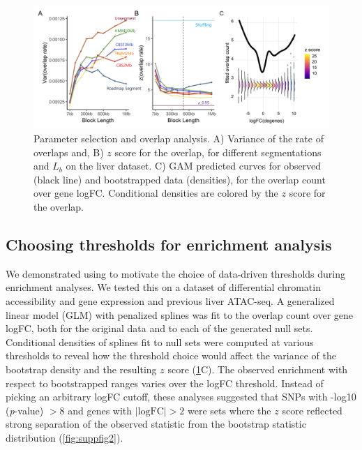 \begin{figure}[H]
\centering%
\setlength{\abovecaptionskip}{-0.1cm}
\setlength{\belowcaptionskip}{-0.1cm}
\includegraphics[scale=0.06]{Figures/fig2_3.jpeg}
\caption{
  Parameter selection and overlap analysis.
  A) Variance of the rate of overlaps and,
  B) $z$ score for the overlap,
  for different segmentations and $L_b$ on the liver 
  dataset.
  C) GAM predicted curves for observed (black line) and
  bootstrapped data (densities),
  for the overlap count over gene logFC.
  Conditional densities are colored by the $z$ score for the overlap.
}
\label{fig:result}
\end{figure}


\subsection{Choosing thresholds for enrichment analysis}
We demonstrated using \bootranges to motivate the choice of data-driven thresholds 
during enrichment analyses. We tested this on a dataset of differential chromatin accessibility and gene expression 
\citep{alasoo2018shared,lee2020fluent} and previous liver ATAC-seq.
A generalized linear model (GLM) with penalized splines was
fit to the overlap count over gene logFC, both for the original
data and to each of the generated null sets.
Conditional densities of splines fit to null sets
were computed at various thresholds to reveal how
the threshold choice would affect the
variance of the bootstrap density and the resulting $z$ score
(\cref{fig:result}C). 
The observed enrichment with respect to bootstrapped ranges 
varies over the logFC threshold. Instead of picking an arbitrary logFC cutoff, 
these analyses suggested that SNPs with -log10 (\textit{p}-value) $> 8$ and 
genes with $|\textrm{logFC}| > 2$ were sets where the $z$ score reflected 
strong separation of the observed statistic from the bootstrap statistic 
distribution
(\cref{fig:suppfig2}).


